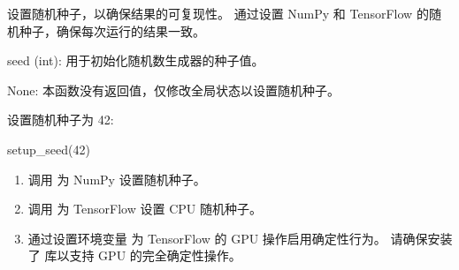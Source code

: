 \documentclass[a4paper,12pt,english]{sphinxmanual}
\begin{document}
\begin{fulllineitems}
\label{\detokenize{api/login:login.setup_seed}}
\pysigstartsignatures
{}
\pysigstopsignatures
\sphinxAtStartPar
设置随机种子，以确保结果的可复现性。
通过设置 NumPy 和 TensorFlow 的随机种子，确保每次运行的结果一致。
\begin{description}
\sphinxAtStartPar
seed (int): 用于初始化随机数生成器的种子值。

\sphinxAtStartPar
None: 本函数没有返回值，仅修改全局状态以设置随机种子。

\sphinxAtStartPar
设置随机种子为 42:
\begin{description}
\sphinxlineitem{::}
\sphinxAtStartPar
setup\_seed(42)

\end{description}

\begin{enumerate}
%
\item {} 
\sphinxAtStartPar
调用  为 NumPy 设置随机种子。

\item {} 
\sphinxAtStartPar
调用  为 TensorFlow 设置 CPU 随机种子。

\item {} 
\sphinxAtStartPar
通过设置环境变量  为 TensorFlow 的 GPU 操作启用确定性行为。
请确保安装了  库以支持 GPU 的完全确定性操作。

\end{enumerate}

\end{description}

\end{fulllineitems}

\end{document}
